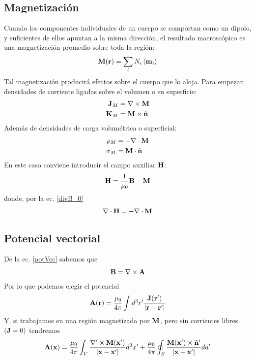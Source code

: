 \documentclass[]{article}
\numberwithin{equation}{section}
\begin{document}
\subsection{Magnetización}
Cuando los componentes individuales de un cuerpo se comportan como un dipolo, y suficientes de ellos apuntan a la misma dirección, el resultado macroscópico es una magnetización promedio sobre toda la región:
\begin{equation}
	\mathbf{M}(\mathbf{r}) = \sum_{i} N_{i} \left\langle\mathbf{m}_{i} \right\rangle 
\end{equation}
Tal magnetización producirá efectos sobre el cuerpo que lo aloja. Para empezar, densidades de corriente ligadas sobre el volumen o su superficie:
\begin{align}
	\mathbf{J}_{M} &= \nabla\times\mathbf{M}\\
	\mathbf{K}_{M} &= \mathbf{M}\times\hat{\mathbf{n}}
\end{align}
Además de densidades de carga volumétrica o superficial:
\begin{align}
	\rho_{M} &= -\nabla\cdot\mathbf{M}\\
	\sigma_{M} &= \mathbf{M}\cdot\hat{\mathbf{n}}
\end{align}
En este caso conviene introducir el campo auxiliar \(\mathbf{H}\):
\begin{equation}
	\mathbf{H} = \frac{1}{\mu_{0}} \mathbf{B} - \mathbf{M}
\end{equation}
donde, por la ec. \ref{divB_0}
\begin{equation}
	\nabla\cdot\mathbf{H} = - \nabla\cdot\mathbf{M}\label{divH_divM}
\end{equation}

\subsection{Potencial vectorial}
De la ec. \ref{potVec} sabemos que
\begin{equation*}
	\mathbf{B} = \nabla\times\mathbf{A}
\end{equation*}
Por lo que podemos elegir el potencial
\begin{equation}
	\mathbf{A}(\mathbf{r}) = \frac{\mu_{0}}{4 \pi} \int d^3 r' \frac{\mathbf{J}(\mathbf{r}')}{|\mathbf{r} - \mathbf{r}'|}\label{A}
\end{equation}
Y, si trabajamos en una región magnetizada por \(\mathbf{M}\), pero sin corrientes libres \((\mathbf{J} = 0)\) tendremos
\begin{equation}
	\mathbf{A}(\mathbf{x}) = \frac{\mu_{0}}{4 \pi} \int_{V} \frac{\nabla'\times\mathbf{M}(\mathbf{x}')}{|\mathbf{x} - \mathbf{x}'|} d^3 x' + \frac{\mu_{0}}{4 \pi} \oint_{S} \frac{\mathbf{M}(\mathbf{x}')\times\hat{\mathbf{n}}'}{|\mathbf{x} - \mathbf{x}'|} da'\label{A_mag}
\end{equation}
\end{document}
